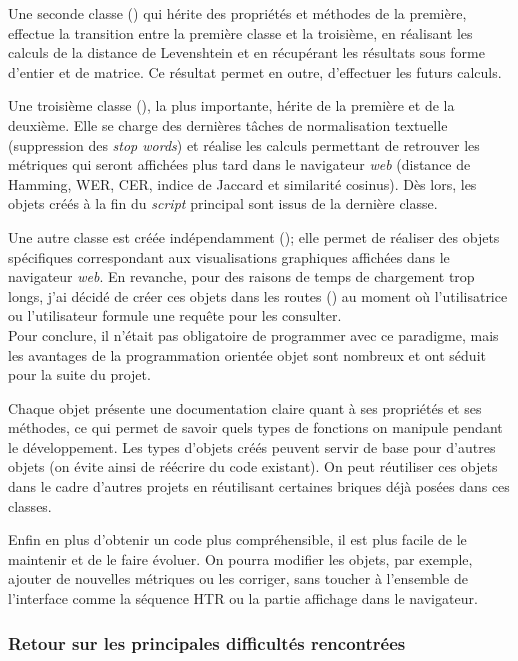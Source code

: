 Une seconde classe () qui hérite des propriétés et méthodes de la première, effectue la transition entre la première classe et la troisième, en réalisant les calculs de la distance de Levenshtein et en récupérant les résultats sous forme d'entier et de matrice. Ce résultat permet en outre, d'effectuer les futurs calculs.

Une troisième classe (), la plus importante, hérite de la première et de la deuxième. Elle se charge des dernières tâches de normalisation textuelle (suppression des \textit{stop words}) et réalise les calculs permettant de retrouver les métriques qui seront affichées plus tard dans le navigateur \textit{web} (distance de Hamming, WER, CER, indice de Jaccard et similarité cosinus). Dès lors, les objets créés à la fin du \textit{script} principal  sont issus de la dernière classe. 

Une autre classe est créée indépendamment (); elle permet de réaliser des objets spécifiques correspondant aux visualisations graphiques affichées dans le navigateur \textit{web}. En revanche, pour des raisons de temps de chargement trop longs, j'ai décidé de créer ces objets dans les routes () au moment où l'utilisatrice ou l'utilisateur formule une requête pour les consulter.\\

Pour conclure, il n'était pas obligatoire de programmer avec ce paradigme, mais les avantages de la programmation orientée objet sont nombreux et ont séduit pour la suite du projet. 

Chaque objet présente une documentation claire quant à ses propriétés et ses méthodes, ce qui permet de savoir quels types de fonctions on manipule pendant le développement. Les types d'objets créés peuvent servir de base pour d'autres objets (on évite ainsi de réécrire du code existant). On peut réutiliser ces objets dans le cadre d'autres projets en réutilisant certaines briques déjà posées dans ces classes. 

Enfin en plus d'obtenir un code plus compréhensible, il est plus facile de le maintenir et de le faire évoluer. On pourra modifier les objets, par exemple, ajouter de nouvelles métriques ou les corriger, sans toucher à l'ensemble de l'interface comme la séquence HTR ou la partie affichage dans le navigateur.

\subsubsection{Retour sur les principales difficultés rencontrées}

